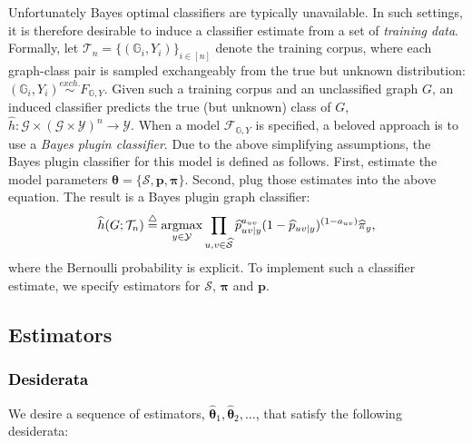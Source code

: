 \documentclass[10pt,journal,cspaper,compsoc]{IEEEtran}
\providecommand{\tk}[1]{\textcolor{black}{#1}}
\providecommand{\ve}[1]{\boldsymbol{#1}}
\newcommand{\argmax}{\operatornamewithlimits{argmax}}
\newcommand{\GG}{\mathbb{G}}
\newcommand{\bth}{\ve{\theta}}
\newcommand{\bhth}{\wh{\ve{\theta}}}
\newcommand{\bTh}{\ve{\Theta}}
\providecommand{\mc}[1]{\mathcal{#1}}
\providecommand{\mb}[1]{\boldsymbol{#1}}
\providecommand{\wh}[1]{\widehat{#1}}
\providecommand{\mhc}[1]{\widehat{\mathcal{#1}}}
\newcommand{\defeq}{\overset{\triangle}{=}}
\newcommand{\from}{{\ensuremath{\colon}}}           %
\newcommand{\comment}[1]{}
\begin{document}
Unfortunately Bayes optimal classifiers are typically unavailable. In such settings, it is therefore desirable to induce a classifier estimate from a set of \emph{training data}. Formally, let $\mc{T}_n= \{(\GG_i,Y_i)\}_{i \in [n]}$ denote the training corpus, where each graph-class pair is sampled exchangeably from the true but unknown distribution: $(\GG_i,Y_i) \overset{exch.}{\sim} F_{\GG, Y}$.  Given such a training corpus and an unclassified graph $G$, an induced classifier predicts the true (but unknown) class of $G$, $\wh{h}\from \mc{G} \times (\mc{G} \times \mc{Y})^n  \to \mc{Y}$.  When a model $\mc{F}_{\GG,Y}$ is specified, a beloved approach is to use a  \emph{Bayes plugin classifier}. Due to the above simplifying assumptions, the Bayes plugin classifier for this model is defined as follows.  First, estimate the  model parameters $\bth=\{\mc{S}, \mb{p}, \mb{\pi}\}$. Second, plug those estimates into the above equation.  The result is a Bayes plugin graph classifier:
\begin{align}
\wh{h}(G; \mc{T}_n) \defeq  \argmax_{y \in \mc{Y}} \prod_{u,v \in \mhc{S}}
\wh{p}_{uv|y}^{a_{uv}}(1-\wh{p}_{uv|y})^{(1-a_{uv})} \wh{\pi}_y,
\end{align}
where the Bernoulli probability is explicit. To implement such a classifier estimate, we specify estimators for $\mc{S}$, $\mb{\pi}$ and $\mb{p}$.


\subsection{Estimators} %
\label{sub:estimators}


\tk{\subsubsection{Desiderata}}

\comment{In this section we describe estimators for the above model.  An \emph{estimator} is a function that maps from the multiple-sample space to the parameter space: $\bhth_n: \Xi^n \to \bTh$. The output of this function is called the \emph{estimate}.  In the graph classification domain, for example, $\Xi=\mc{G} \times \mc{Y}$.  In a slight abuse of notation, we will also refer to the sequence of estimators, $\bhth_1,\bhth_2, \ldots$, as an estimator.}  We desire a \comment{(}sequence of\comment{)} estimators\tk{, $\bhth_1,\bhth_2, \ldots$,} that satisfy the following desiderata:
\end{document}

